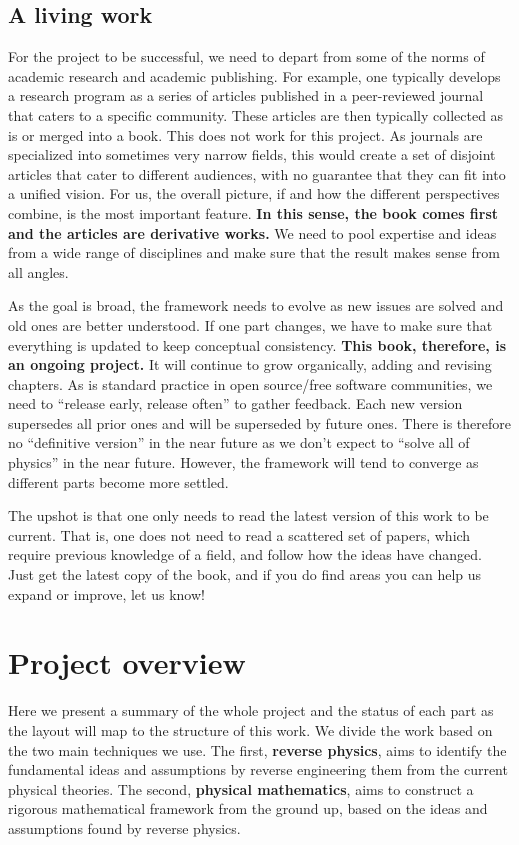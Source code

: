 \documentclass[11pt,letterpaper,fleqn]{memoir} %
\begin{document}
\subsection{A living work}

For the project to be successful, we need to depart from some of the norms of academic research and academic publishing. For example, one typically develops a research program as a series of articles published in a peer-reviewed journal that caters to a specific community. These articles are then typically collected as is or merged into a book. This does not work for this project. As journals are specialized into sometimes very narrow fields, this would create a set of disjoint articles that cater to different audiences, with no guarantee that they can fit into a unified vision. For us, the overall picture, if and how the different perspectives combine, is the most important feature. \textbf{In this sense, the book comes first and the articles are derivative works.} We need to pool expertise and ideas from a wide range of disciplines and make sure that the result makes sense from all angles.

As the goal is broad, the framework needs to evolve as new issues are solved and old ones are better understood. If one part changes, we have to make sure that everything is updated to keep conceptual consistency. \textbf{This book, therefore, is an ongoing project.} It will continue to grow organically, adding and revising chapters. As is standard practice in open source/free software communities, we need to ``release early, release often'' to gather feedback. Each new version supersedes all prior ones and will be superseded by future ones. There is therefore no ``definitive version'' in the near future as we don't expect to ``solve all of physics'' in the near future. However, the framework will tend to converge as different parts become more settled.

The upshot is that one only needs to read the latest version of this work to be current. That is, one does not need to read a scattered set of papers, which require previous knowledge of a field, and follow how the ideas have changed. Just get the latest copy of the book, and if you do find areas you can help us expand or improve, let us know!

\section{Project overview}

Here we present a summary of the whole project and the status of each part as the layout will map to the structure of this work. We divide the work based on the two main techniques we use. The first, \textbf{reverse physics}, aims to identify the fundamental ideas and assumptions by reverse engineering them from the current physical theories. The second, \textbf{physical mathematics}, aims to construct a rigorous mathematical framework from the ground up, based on the ideas and assumptions found by reverse physics.
\end{document}
